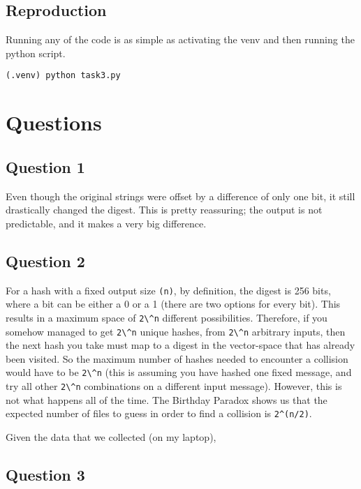 \documentclass[11pt]{article}
\begin{document}
\subsection*{Reproduction}

Running any of the code is as simple as activating the venv and then running the python script.

\verb|(.venv) python task3.py|

\section*{Questions}
\subsection*{Question 1}

Even though the original strings were offset by a difference of only one bit, it still drastically changed the digest. This is pretty reassuring; the output is not predictable, and it makes a very big difference.

\subsection*{Question 2}

For a hash with a fixed output size \verb|(n)|, by definition, the digest is 256 bits, where a bit can be either a 0 or a 1 (there are two options for every bit). This results in a maximum space of \verb|2\^n| different possibilities. Therefore, if you somehow managed to get \verb|2\^n| unique hashes, from \verb|2\^n| arbitrary inputs, then the next hash you take must map to a digest in the vector-space that has already been visited. So the maximum number of hashes needed to encounter a collision would have to be \verb|2\^n| (this is assuming you have hashed one fixed message, and try all other \verb|2\^n| combinations on a different input message). However, this is not what happens all of the time. The Birthday Paradox shows us that the expected number of files to guess in order to find a collision is \verb|2^(n/2)|.

Given the data that we collected (on my laptop),


\subsection*{Question 3}
\end{document}
